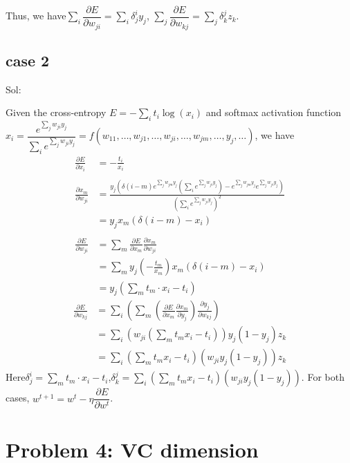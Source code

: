 \documentclass[a4paper,12pt]{article}
\begin{document}
Thus, we have\qquad $\sum_{i} \dfrac{\partial E}{\partial w_{ji}} = \sum_i \delta_j^i y_j$, \qquad $\sum_{j} \dfrac{\partial E}{\partial w_{kj}} = \sum_j \delta_k^j z_k$. 

\subsection{case 2}

Sol:

Given the cross-entropy $E = -\sum_i t_i \log(x_i)$ and softmax activation function $x_i = \dfrac{e^{\sum_{j} w_{ji} y_j}}{\sum_{i} e^{\sum_{j} w_{ji}y_j}} = f(w_{11}, \ldots , w_{j1}, \ldots, w_{ji}, \ldots,  w_{jm}, \ldots , y_j, \ldots)$, we have
\begin{align}
\frac{\partial E}{\partial x_i} &= - \frac{t_i}{x_i} \nonumber \\
\quad  \nonumber \\
\frac{\partial x_m}{\partial w_{ji}} & =  \frac{y_j(\delta(i-m) e^{\sum_{j}w_{jm}y_j}( \sum_{i}e^{\sum_{j}w_{ji}y_j} ) - e^{\sum_{j}w_{jm}y_j} e^{\sum_{j}w_{ji}y_j})}{(\sum_{i} e^{\sum_{j} w_{ji}y_j})^2}   \nonumber  \\
& = y_j x_m( \delta(i-m) - x_i)  \nonumber \\
\nonumber \\
\frac{\partial E}{\partial w_{ji}} & = \sum_{m} \frac{\partial E}{\partial x_m} \frac{\partial x_m}{\partial w_{ji}}   \nonumber \\
& = \sum_{m} y_j (-\frac{t_m}{x_m}) x_m( \delta(i - m) - x_i)  \nonumber \\
& = y_j (\sum_{m} t_m \cdot x_i - t_i) \nonumber 
\end{align}
\begin{align}
\frac{\partial E}{\partial w_{kj}} & = \sum_{i}( \sum_{m} (\frac{\partial E}{\partial x_m} \frac{\partial x_m}{\partial y_j}) \frac{\partial y_j}{\partial w_{kj}} ) \nonumber \\
& = \sum_{i} (w_{ji} (\sum_{m} t_m x_i - t_i)) y_j (1 - y_j) z_k \nonumber \\
& =  \sum_{i}(\sum_{m} t_m x_i - t_i)(w_{ji} y_j(1- y_j)) z_k \nonumber
\end{align}
Here\quad$\delta_j^i = \sum_{m} t_m \cdot x_i - t_i$,\quad$\delta_k^j =  \sum_{i}(\sum_{m} t_m x_i - t_i)(w_{ji} y_j(1- y_j))$. For both cases, \quad$w^{t+1} = w^{t} - \eta \dfrac{\partial E}{\partial w^{t}}$.

\section{Problem 4: VC dimension}
\end{document}
